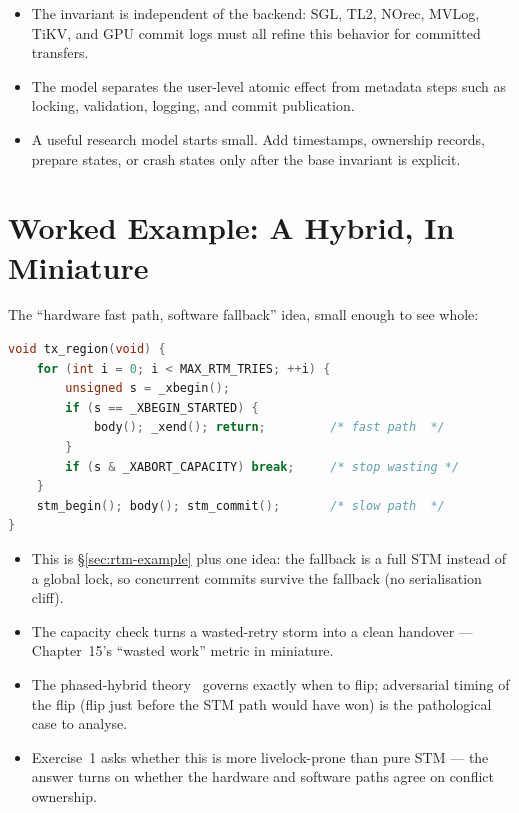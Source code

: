 \begin{itemize}
    \item The invariant is independent of the backend: SGL, TL2, NOrec, MVLog, TiKV, and GPU commit logs must all refine this behavior for committed transfers.
    \item The model separates the user-level atomic effect from metadata steps such as locking, validation, logging, and commit publication.
    \item A useful research model starts small. Add timestamps, ownership records, prepare states, or crash states only after the base invariant is explicit.
\end{itemize}

\section{Worked Example: A Hybrid, In Miniature}
\label{sec:hybrid-example}

The ``hardware fast path, software fallback'' idea, small enough to see whole:

\begin{lstlisting}[language=C, caption={A minimal phased hybrid: try RTM, fall back to the STM.}]
void tx_region(void) {
    for (int i = 0; i < MAX_RTM_TRIES; ++i) {
        unsigned s = _xbegin();
        if (s == _XBEGIN_STARTED) {
            body(); _xend(); return;         /* fast path  */
        }
        if (s & _XABORT_CAPACITY) break;     /* stop wasting */
    }
    stm_begin(); body(); stm_commit();       /* slow path  */
}
\end{lstlisting}

\begin{itemize}
    \item This is \S\ref{sec:rtm-example} plus one idea: the fallback is a full STM instead of a global lock, so concurrent commits survive the fallback (no serialisation cliff).
    \item The capacity check turns a wasted-retry storm into a clean handover --- Chapter~15's ``wasted work'' metric in miniature.
    \item The phased-hybrid theory~\cite{lev07phased} governs exactly when to flip; adversarial timing of the flip (flip just before the STM path would have won) is the pathological case to analyse.
    \item Exercise~1 asks whether this is more livelock-prone than pure STM --- the answer turns on whether the hardware and software paths agree on conflict ownership.
\end{itemize}


